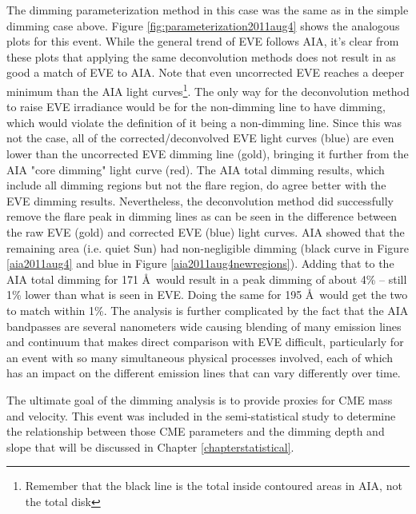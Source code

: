 The dimming parameterization method in this case was the same as in the simple dimming case above. Figure \ref{fig:parameterization2011aug4} shows the analogous plots for this event. While the general trend of EVE follows AIA, it's clear from these plots that applying the same deconvolution methods does not result in as good a match of EVE to AIA. Note that even uncorrected EVE reaches a deeper minimum than the AIA light curves\footnote{Remember that the black line is the total inside contoured areas in AIA, not the total disk}. The only way for the deconvolution method to raise EVE irradiance would be for the non-dimming line to have dimming, which would violate the definition of it being a non-dimming line. Since this was not the case, all of the corrected/deconvolved EVE light curves (blue) are even lower than the uncorrected EVE dimming line (gold), bringing it further from the AIA "core dimming" light curve (red). The AIA total dimming results, which include all dimming regions but not the flare region, do agree better with the EVE dimming results. Nevertheless, the deconvolution method did successfully remove the flare peak in dimming lines as can be seen in the difference between the raw EVE (gold) and corrected EVE (blue) light curves. AIA showed that the remaining area (i.e. quiet Sun) had non-negligible dimming (black curve in Figure \ref{aia2011aug4} and blue in Figure \ref{aia2011aug4newregions}). Adding that to the AIA total dimming for 171 \AA\ would result in a peak dimming of about 4\% -- still 1\% lower than what is seen in EVE. Doing the same for 195 \AA\ would get the two to match within 1\%. The analysis is further complicated by the fact that the AIA bandpasses are several nanometers wide causing blending of many emission lines and continuum that makes direct comparison with EVE difficult, particularly for an event with so many simultaneous physical processes involved, each of which has an impact on the different emission lines that can vary differently over time. 

The ultimate goal of the dimming analysis is to provide proxies for CME mass and velocity. This event was included in the semi-statistical study to determine the relationship between those CME parameters and the dimming depth and slope that will be discussed in Chapter \ref{chapterstatistical}. 


